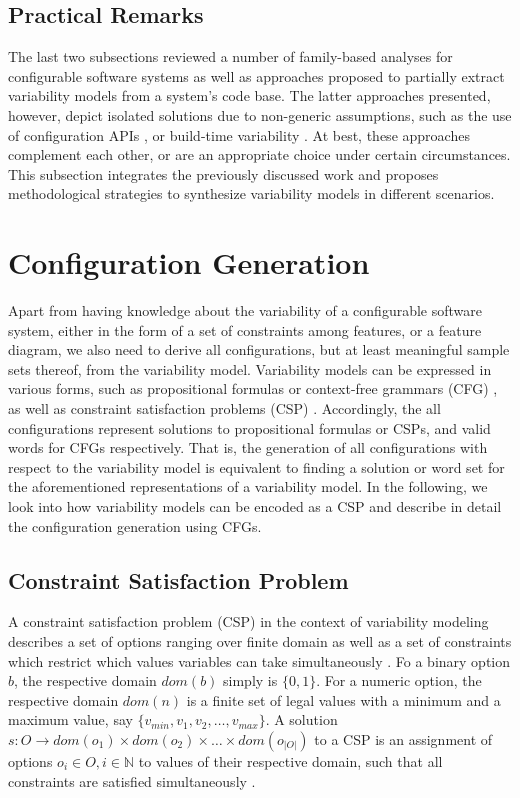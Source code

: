 \subsection{Practical Remarks}
The last two subsections reviewed a number of family-based analyses for
configurable software systems as well as approaches proposed to partially
extract variability models from a system’s code base. The latter approaches
presented, however, depict isolated solutions due to non-generic assumptions,
such as the use of configuration APIs \citep{rabkin_static_2011}, or build-time
variability \citep{nadi_where_2015}. At best, these approaches complement each
other, or are an appropriate choice under certain circumstances. This
subsection integrates the previously discussed work and proposes methodological
strategies to synthesize variability models in different scenarios.

\section{Configuration Generation}\label{sec:configuration_gen}
Apart from having knowledge about the variability of a configurable software
system, either in the form of a set of constraints among features, or a feature
diagram, we also need to derive all configurations, but at least meaningful
sample sets thereof, from the variability model. Variability models can be
expressed in various forms, such as propositional formulas or context-free
grammars (CFG) \citep{batory_feature_2005}, as well as constraint satisfaction
problems (CSP) \citep{benavides_automated_2005,benavides_using_2005}.
Accordingly, the all configurations represent solutions to propositional formulas or CSPs, and valid words for CFGs
respectively. That is, the generation of all configurations with respect to the
variability model is equivalent to finding a solution or word set for the
aforementioned representations of a variability model. In the following, we
look into how variability models can be encoded as a CSP and describe in detail
the configuration generation using CFGs.

\subsection{Constraint Satisfaction Problem}
A constraint satisfaction problem (CSP) in the context of variability modeling
describes a set of options ranging over finite domain as well as a set of
constraints which restrict which values variables can take simultaneously
\citep{benavides_automated_2005}. Fo a binary option $b$, the respective domain
$dom(b)$ simply is $\lbrace 0, 1\rbrace$.
For a numeric option, the respective domain $dom(n)$ is a finite set of legal
values with a minimum and a maximum value, say $\lbrace v_{min}, v_1,
v_2, \ldots, v_{max}\rbrace$.
A solution $s: O \rightarrow dom(o_1) \times dom(o_2) \times \ldots \times
dom(o_{|O|})$ to a CSP is an assignment of options $o_i \in O, i \in \mathbb{N}$
to values of their respective domain, such that all constraints are satisfied simultaneously \citep{benavides_automated_2005}.  

